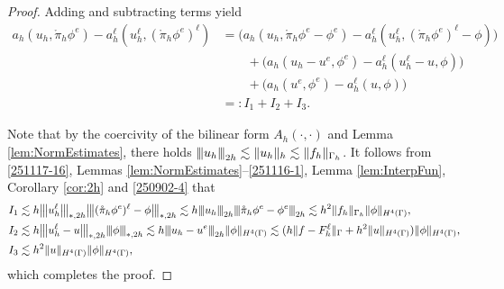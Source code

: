\documentclass[10pt, a4paper]{amsart}
\theoremstyle{definition}
\theoremstyle{remark}
\theoremstyle{example}
\numberwithin{equation}{section}
\newcommand{\tbar}[1]{{\left\vert\kern-0.25ex\left\vert\kern-0.25ex\left\vert #1 
    \right\vert\kern-0.25ex\right\vert\kern-0.25ex\right\vert}}
\begin{document}
\begin{proof}
Adding and subtracting terms yield
\begin{align*}
a_h(u_h, \mathring{\pi}_h\phi^e) - a_h^\ell(u_h^\ell, (\mathring{\pi}_h\phi^e)^\ell)
& = \big(a_h(u_h, \mathring{\pi}_h\phi^e - \phi^e) - a_h^\ell(u_h^\ell, (\mathring{\pi}_h\phi^e)^\ell - \phi)\big) \\
& \qquad + \big(a_h(u_h - u^e, \phi^e) - a_h^\ell(u_h^\ell - u, \phi)\big) \\
& \qquad + \big(a_h(u^e, \phi^e) - a_h^\ell(u, \phi)\big) \\
& =: I_1 + I_2 + I_3.
\end{align*}


Note that by the coercivity of the bilinear form $A_h(\cdot,\cdot)$
and Lemma \ref{lem:NormEstimates}, there holds $\tbar{u_h}_{2h}\lesssim \|u_h\|_h\lesssim \|f_h\|_{\Gamma_h}$.
It follows from \eqref{251117-16}, Lemmas \ref{lem:NormEstimates}--\ref{251116-1}, Lemma \ref{lem:InterpFun},  Corollary \ref{cor:2h} 
and \eqref{250902-4} that
\begin{align*}
I_1
& \lesssim h\tbar{u_h^\ell}_{*, 2h}\tbar{(\mathring{\pi}_h\phi^e)^\ell - \phi}_{*, 2h} 
 \lesssim h\tbar{u_h}_{2h}\tbar{\mathring{\pi}_h\phi^e - \phi^e}_{2h} 
 \lesssim h^2\|f_h\|_{\Gamma_h}\|\phi\|_{H^4(\Gamma)}, \\
I_2
& \lesssim h\tbar{u_h^\ell - u}_{*, 2h}\tbar{\phi}_{*, 2h} 
 \lesssim h\tbar{u_h - u^e}_{2h}\|\phi\|_{H^4(\Gamma)} 
 \lesssim (h\|f - F_h^\ell\|_{\Gamma} + h^2\|u\|_{H^4(\Gamma)})\|\phi\|_{H^4(\Gamma)}, \\
I_3
& \lesssim h^2\|u\|_{H^4(\Gamma)}\|\phi\|_{H^4(\Gamma)},
\end{align*}
which completes the proof.
\end{proof}
\end{document}
